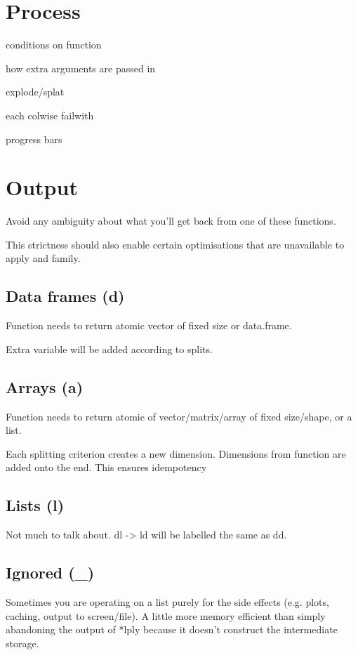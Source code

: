 \documentclass[letterpaper,oneside]{scrartcl}
\begin{document}
\section{Process}

conditions on function

how extra arguments are passed in

explode/splat

each
colwise
failwith

progress bars

\section{Output}

Avoid any ambiguity about what you'll get back from one of these functions.  

This strictness should also enable certain optimisations that are unavailable to apply and family.

\subsection{Data frames (d)}

Function needs to return atomic vector of fixed size or data.frame.

Extra variable will be added according to splits.

\subsection{Arrays (a)}

Function needs to return atomic of vector/matrix/array of fixed size/shape, or a list.

Each splitting criterion creates a new dimension.  Dimensions from function are added onto the end.  This ensures idempotency

\subsection{Lists (l)}

Not much to talk about.  dl -> ld will be labelled the same as dd.

\subsection{Ignored (\_)}

Sometimes you are operating on a list purely for the side effects (e.g. plots, caching, output to screen/file).  A little more memory efficient than simply abandoning the output of *lply because it doesn't construct the intermediate storage.
\end{document}
